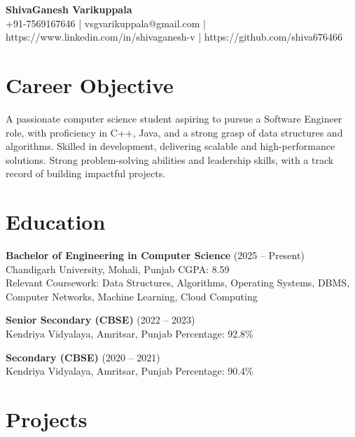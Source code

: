 \documentclass[a4paper,10pt]{article}
\begin{document}
\begin{center}
    {\LARGE \textbf{\color{myblue}ShivaGanesh Varikuppala}} \\
    \vspace{4pt}
    \small
    +91-7569167646 \;|\;
    vsgvarikuppala@gmail.com \;|\;
    https://www.linkedin.com/in/shivaganesh-v \;|\;
    https://github.com/shiva676466
\end{center}

\vspace{-10pt}

\section*{Career Objective}
A passionate computer science student aspiring to pursue a Software Engineer role, with proficiency in C++, Java, and a strong grasp of data structures and algorithms. Skilled in development, delivering scalable and high-performance solutions. Strong problem-solving abilities and leadership skills, with a track record of building impactful projects.

\section*{Education}

\textbf{Bachelor of Engineering in Computer Science} \hfill (2025 -- Present) \\
Chandigarh University, Mohali, Punjab \hfill CGPA: 8.59 \\
Relevant Coursework: Data Structures, Algorithms, Operating Systems, DBMS, Computer Networks, Machine Learning, Cloud Computing

\vspace{4pt}

\textbf{Senior Secondary (CBSE)} \hfill (2022 -- 2023) \\
Kendriya Vidyalaya, Amritsar, Punjab \hfill Percentage: 92.8\%

\vspace{4pt}

\textbf{Secondary (CBSE)} \hfill (2020 -- 2021) \\
Kendriya Vidyalaya, Amritsar, Punjab \hfill Percentage: 90.4\%

\section*{Projects}
\end{document}
